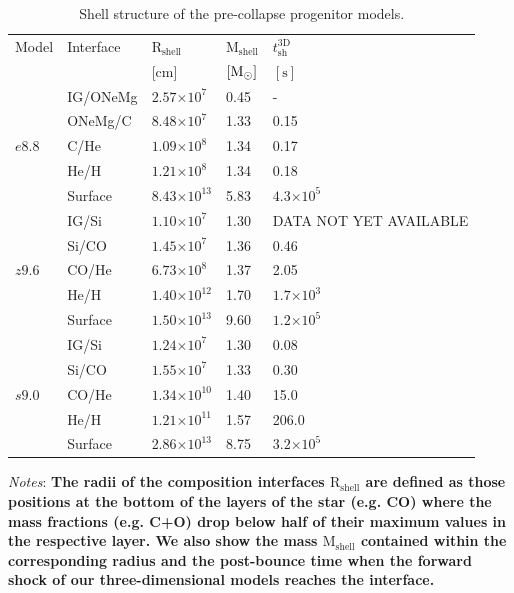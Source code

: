 \documentclass[fleqn,usenatbib]{mnras}
\newcommand{\solm}{\ensuremath{\rm{M_{\odot}}}\xspace}
\newcommand{\s}{\ensuremath{\text{s}}}
\newcommand{\COM}[1]{{\color{orange}#1}}
\begin{document}
\begin{table}
   \caption{Shell structure of the pre-collapse progenitor models.}
   \label{tab:progenitors}
   \begin{tabular}{l l l l l} 
   \hline
     Model      &Interface & $\mathrm{R_{shell}\,}$ & $\mathrm{M_{shell}}$ & $t_{\mathrm{sh}}^{\mathrm{3D}}$\\ [0.5ex] 
                &          & [cm] & $[\solm]$ & $[\s]$\\ [0.5ex] 
   \hline
   \multirow{5}{*}{$e8.8$} & IG/ONeMg & $2.57\mathord{\times} 10^{7}$  & 0.45 & - \\ 
                           & ONeMg/C    & $8.48\mathord{\times} 10^{7}$  & 1.33 & 0.15 \\
                           & C/He       & $1.09\mathord{\times} 10^{8}$  & 1.34 & 0.17 \\
                           & He/H       & $1.21\mathord{\times} 10^{8}$  & 1.34 & 0.18\\
                           & Surface    & $8.43\mathord{\times} 10^{13}$ & 5.83 & $4.3\mathord{\times}10^5$\\
   \hline
   \multirow{5}{*}{$z9.6$} & IG/Si    & $1.10\mathord{\times} 10^{7}$  & 1.30 & \COM{DATA NOT YET AVAILABLE}\\ 
                           & Si/CO       & $1.45\mathord{\times} 10^{7}$  & 1.36 & 0.46\\ 
                           & CO/He      & $6.73\mathord{\times} 10^{8}$  & 1.37 & 2.05\\
                           & He/H       & $1.40\mathord{\times} 10^{12}$ & 1.70 & $1.7\mathord{\times}10^{3}$\\
                           & Surface    & $1.50\mathord{\times} 10^{13}$ & 9.60 & $1.2\mathord{\times}10^5$  \\
   \hline
   \multirow{5}{*}{$s9.0$} & IG/Si    & $1.24\mathord{\times} 10^{7}$   & 1.30 & 0.08 \\ 
                           & Si/CO       & $1.55\mathord{\times} 10^{7}$   & 1.33 & 0.30 \\ 
                           & CO/He      & $1.34\mathord{\times} 10^{10}$  & 1.40 & 15.0 \\
                           & He/H       & $1.21\mathord{\times} 10^{11}$  & 1.57 & 206.0 \\
                           & Surface    & $2.86\mathord{\times} 10^{13}$  & 8.75 & $3.2\mathord{\times} 10^5$ \\
  \hline
   \end{tabular}

\flushleft
\textit{Notes}: \textbf{The radii of the composition interfaces $\mathrm{R}_{\mathrm{shell}}$ are defined as those positions at the bottom of the layers of the star (e.g. CO) where the mass fractions (e.g. C+O) drop below half of their maximum values in the respective layer. We also show the mass $\mathrm{M}_{\mathrm{shell}}$ contained within the corresponding radius and the post-bounce time when the forward shock of our three-dimensional models reaches the interface.}
\end{table}
\end{document}

